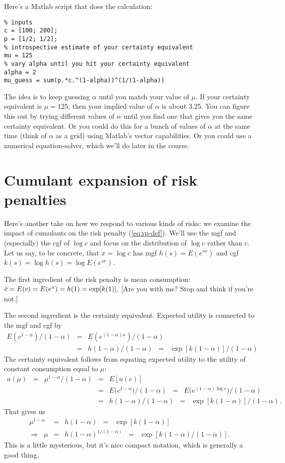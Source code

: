 \documentclass[11pt]{article}
\begin{document}
Here's a Matlab script that does the calculation:
\begin{verbatim}
% inputs
c = [100; 200];
p = [1/2; 1/2];
% introspective estimate of your certainty equivalent
mu = 125
% vary alpha until you hit your certainty equivalent
alpha = 2
mu_guess = sum(p.*c.^(1-alpha))^(1/(1-alpha))
\end{verbatim}
The idea is to keep guessing $\alpha$ until you match your value of $\mu$.
If your certainty equivalent is $\mu = 125$, then
your implied value of $\alpha$ is about 3.25.
You can figure this out by trying different values of $\alpha$
until you find one that gives you the same certainty equivalent.
Or you could do this for a bunch of values of $\alpha$ at the same time
(think of $\alpha$ as a grid)
using Matlab's vector capabilities.
Or you could use a numerical equation-solver,
which we'll do later in the course.


\section{Cumulant expansion of risk penalties}

Here's another take on how we respond to various kinds of risks:
we examine the impact of cumulants on the risk penalty (\ref{eq:rp-def}).
We'll use the  mgf and (especially) the cgf of $\log c$
and focus on the distribution of $\log c$ rather than $c$.
Let us say, to be concrete,
that $x = \log c$ has mgf $h(s) = E (e^{sx})$ and cgf $k(s) = \log h(s) = \log E (e^{sx}) $.

The first ingredient of the risk penalty is mean consumption:
$\bar{c} = E(c) = E (e^x) = h(1) = \exp[k(1)]$.
[Are you with me?  Stop and think if you're not.]

The second ingredient is the certainty equivalent.
Expected utility is connected to the mgf and cgf by
\begin{eqnarray*}
    E (c^{1-\alpha})/(1-\alpha) &=& E (e^{(1-\alpha) x})/(1-\alpha) \\
        &=&  h(1-\alpha)/(1-\alpha) \;\;=\;\; \exp[k(1-\alpha)]/(1-\alpha)
\end{eqnarray*}
The certainty equivalent follows from equating expected utility to the utility
of constant consumption equal to $\mu$:
\begin{eqnarray*}
    u (\mu) \;\;=\;\; \mu^{1-\alpha}/(1-\alpha)
            &=& E [u(c)]  \\
            &=& E \big( c^{1-\alpha} \big)/(1-\alpha)
                    \;\;=\;\; E \Big( e^{(1-\alpha) \log c} \Big)/(1-\alpha) \\
            &=& h(1-\alpha)/(1-\alpha) \;\;=\;\; \exp[k(1-\alpha)]/(1-\alpha) .
\end{eqnarray*}
That gives us
\begin{eqnarray*}
    \mu^{1-\alpha} &=& h(1-\alpha) \;\;=\;\; \exp[k(1-\alpha)] \\
    \Rightarrow \;\; \mu &=&  h(1-\alpha)^{1/(1-\alpha)} \;\;=\;\; \exp[k(1-\alpha)/(1-\alpha)]  .
\end{eqnarray*}
This is a little mysterious, but it's nice compact notation,
which is generally a good thing.
\end{document}
